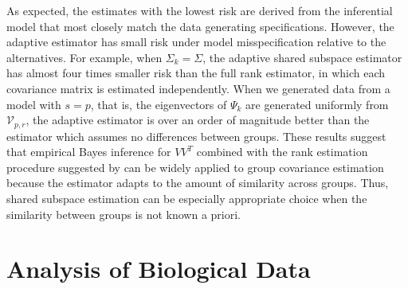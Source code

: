 \documentclass[12pt]{article}
\begin{document}
As expected, the estimates with the lowest risk are derived from the
inferential model that most closely match the data generating
specifications. However, the adaptive estimator has small risk under
model misspecification relative to the alternatives.  For example,
when $\Sigma_k = \Sigma$, the adaptive shared subspace estimator has
almost four times smaller risk than the full rank estimator, in which
each covariance matrix is estimated independently.  When we generated
data from a model with $s=p$, that is, the eigenvectors of $\Psi_k$
are generated uniformly from $\mathcal{V}_{p,r}$, the adaptive
estimator is over an order of magnitude better than the estimator
which assumes no differences between groups.  These results suggest
that empirical Bayes inference for $VV^T$ combined with the rank
estimation procedure suggested by \citet{Gavish2014} can be widely
applied to group covariance estimation because the estimator adapts to
the amount of similarity across groups.  Thus, shared subspace estimation
can be especially appropriate choice when the similarity between
groups is not known a priori.  %



\section{Analysis of Biological Data}
\label{sec:app}
\end{document}
